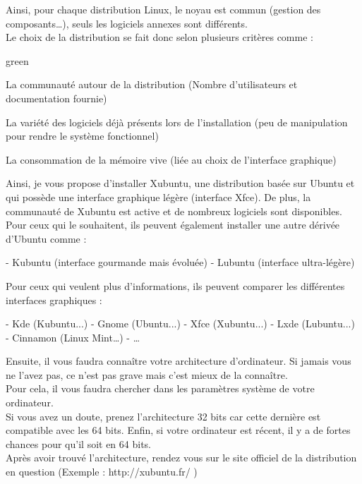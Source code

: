 {Ainsi, pour chaque distribution Linux, le noyau est commun (gestion des composants…), 
seuls les logiciels annexes sont différents.\\
Le choix de la distribution se fait donc selon plusieurs critères comme : \\

\begin{items}{green}{\faviconLeaf}
\item La communauté autour de la distribution (Nombre d’utilisateurs et documentation fournie)
\item La variété des logiciels déjà présents lors de l’installation (peu de manipulation pour rendre 
le système fonctionnel)
\item La consommation de la mémoire vive (liée au choix de l’interface graphique)
\end{items}

Ainsi, je vous propose d’installer Xubuntu, une distribution basée sur Ubuntu et qui possède une 
interface graphique légère (interface Xfce). De plus, la communauté de Xubuntu est active et de nombreux 
logiciels sont disponibles.\\


Pour ceux qui le souhaitent, ils peuvent également installer une autre dérivée d'Ubuntu comme :

- Kubuntu  (interface gourmande mais évoluée)
- Lubuntu  (interface ultra-légère)

Pour ceux qui veulent plus d’informations, ils peuvent comparer les différentes interfaces graphiques :

- Kde			(Kubuntu...)
- Gnome		(Ubuntu...)
- Xfce			(Xubuntu...)
- Lxde			(Lubuntu...)
- Cinnamon 		(Linux Mint…)
- …


Ensuite, il vous faudra connaître votre architecture d’ordinateur. Si jamais vous ne l’avez pas, 
ce n’est pas grave mais c’est mieux de la connaître.\\
Pour cela, il vous faudra chercher dans les paramètres système de votre ordinateur.\\


Si vous avez un doute, prenez l’architecture 32 bits car cette dernière est compatible avec 
les 64 bits. Enfin, si votre ordinateur est récent, il y a de fortes chances pour qu’il soit en 64 bits.\\


Après avoir trouvé l'architecture, rendez vous sur le site officiel de la distribution en question 
(Exemple : http://xubuntu.fr/ )\\

}
